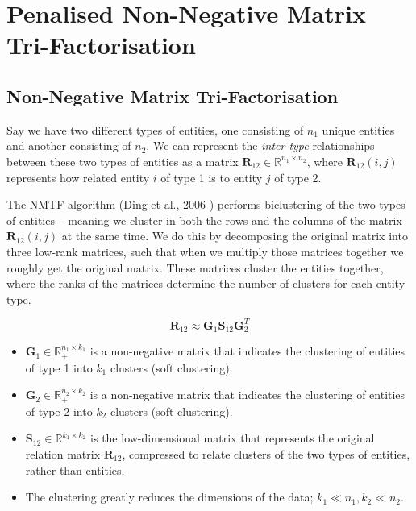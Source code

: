 \documentclass{article}
\begin{document}
	\section{Penalised Non-Negative Matrix Tri-Factorisation}
		\subsection{Non-Negative Matrix Tri-Factorisation}
			Say we have two different types of entities, one consisting of \( n_1 \) unique entities and another consisting of \( n_2 \). We can represent the \textit{inter-type} relationships between these two types of entities as a matrix \( \boldsymbol R_{12} \in \mathbb{R}^{n_1 \times n_2} \), where \( \boldsymbol R_{12}(i,j) \) represents how related entity \( i \) of type 1 is to entity \( j \) of type 2. 
			
			The NMTF algorithm (Ding et al., 2006 \cite{ding_2006}) performs biclustering of the two types of entities -- meaning we cluster in both the rows and the columns of the matrix \( \boldsymbol R_{12}(i,j) \) at the same time. We do this by decomposing the original matrix into three low-rank matrices, such that when we multiply those matrices together we roughly get the original matrix. These matrices cluster the entities together, where the ranks of the matrices determine the number of clusters for each entity type.
			
			\begin{equation*}
				\boldsymbol R_{12} \approx \boldsymbol G_1 \boldsymbol S_{12} \boldsymbol G_2^T
			\end{equation*}
			
			\begin{itemize}
				\item \( \boldsymbol G_1 \in \mathbb{R}_+^{n_1 \times k_1} \) is a non-negative matrix that indicates the clustering of entities of type 1 into \( k_1 \) clusters (soft clustering).
				\item \( \boldsymbol G_2 \in \mathbb{R}_+^{n_2 \times k_2} \) is a non-negative matrix that indicates the clustering of entities of type 2 into \( k_2 \) clusters (soft clustering).
				\item \( \boldsymbol S_{12} \in \mathbb{R}^{k_1 \times k_2} \) is the low-dimensional matrix that represents the original relation matrix \( \boldsymbol R_{12} \), compressed to relate clusters of the two types of entities, rather than entities.
				\item The clustering greatly reduces the dimensions of the data; \( k_1 \ll n_1, k_2 \ll n_2 \).
			\end{itemize}
			
\end{document}
